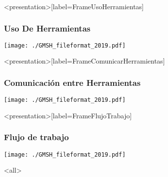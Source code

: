 \mode*
\begin{frame}<presentation>[label=FrameUsoHerramientas]
  \frametitle{Uso De Herramientas}
  \texttt{[image: ./GMSH\_fileformat\_2019.pdf]}
\end{frame}

\begin{frame}<presentation>[label=FrameComunicarHerramientas]
  \frametitle{Comunicación entre Herramientas}
  \texttt{[image: ./GMSH\_fileformat\_2019.pdf]}
\end{frame}

\begin{frame}<presentation>[label=FrameFlujoTrabajo]
  \frametitle{Flujo de trabajo}
  \texttt{[image: ./GMSH\_fileformat\_2019.pdf]}

\end{frame}
\mode<all>
